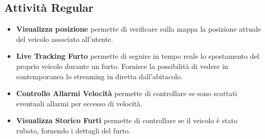 \documentclass[a4paper,12pt]{article}
\begin{document}
\subsection{Attività Regular}
\begin{itemize}
\item \textbf{Visualizza posizione} permette di verificare sulla mappa la posizione attuale del veicolo associato all'utente.

\item \textbf{Live Tracking Furto} permette di seguire in tempo reale lo spostamento del proprio veicolo durante un furto. Fornisce la possibilità di vedere in contemporanea lo streaming in diretta dall'abitacolo.

\item \textbf{Controllo Allarmi Velocità} permette di controllare se sono scattati eventuali allarmi per eccesso di velocità.

\item \textbf{Visualizza Storico Furti} permette di controllare se il veicolo è stato rubato, fornendo i dettagli del furto.

\end{itemize}
\end{document}
